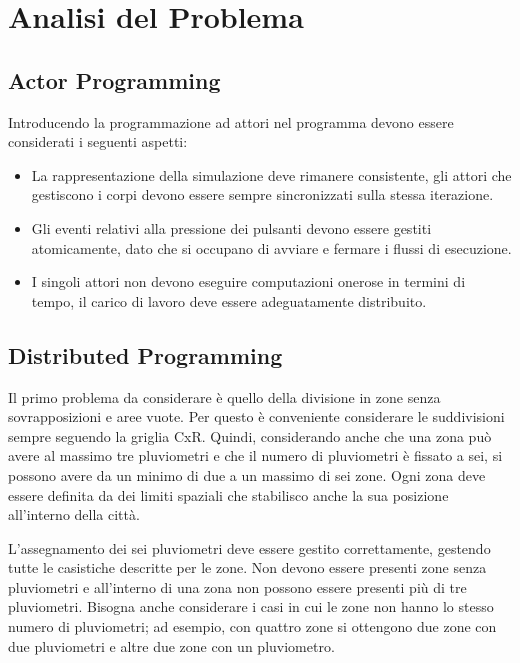 \documentclass[12pt,a4paper,openright,twoside]{book}
\begin{document}
\chapter{Analisi del Problema}
\label{chap:Analisi del Problema}
\section{Actor Programming}
Introducendo la programmazione ad attori nel programma devono essere considerati i seguenti aspetti:
\begin{itemize}
	\item La rappresentazione della simulazione deve rimanere
	consistente, gli attori che gestiscono i corpi devono essere sempre sincronizzati sulla stessa iterazione.
	\item Gli eventi relativi alla pressione dei pulsanti
	devono essere gestiti atomicamente, dato che si occupano di
	avviare e fermare i flussi di esecuzione.
	\item I singoli attori non devono eseguire computazioni onerose in termini di tempo, il carico di lavoro deve essere adeguatamente distribuito.
\end{itemize}



\section{Distributed Programming}
Il primo problema da considerare è quello della divisione in zone senza sovrapposizioni e aree vuote. Per questo è conveniente considerare le suddivisioni sempre seguendo la griglia CxR. Quindi, considerando anche che una zona può avere al massimo tre pluviometri e che il numero di pluviometri è fissato a sei, si possono avere da un minimo di due a un massimo di sei zone. Ogni zona deve essere definita da dei limiti spaziali che stabilisco anche la sua posizione all'interno della città.

L'assegnamento dei sei pluviometri deve essere gestito correttamente, gestendo tutte le casistiche descritte per le zone. Non devono essere presenti zone senza pluviometri e all'interno di una zona non possono essere presenti più di tre pluviometri. Bisogna anche considerare i casi in cui le zone non hanno lo stesso numero di pluviometri; ad esempio, con quattro zone si ottengono due zone con due pluviometri e altre due zone con un pluviometro.
\end{document}
